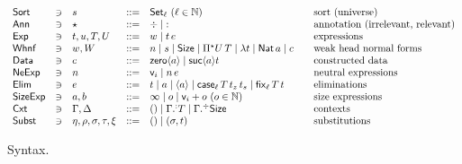 \documentclass[acmlarge,review,anonymous]{acmart}\settopmatter{printfolios=true}
\begin{document}
\begin{figure}[htbp]
  \centering
\[
\begin{array}{lllrl@{\qquad}l}
\Sort & \ni & s
    & ::= & \Set[\ell] ~(\ell \in \NN)& \mbox{sort (universe)} \\
\Ann & \ni & \star & ::= & \erased \mid \noterased & \mbox{annotation (irrelevant, relevant)}\\
\Exp & \ni & t,u,T,U
    & ::= & w \mid t\,e & \mbox{expressions} \\
\Whnf & \ni & w, W
    & ::= & n \mid s \mid \Size \mid \epiT U T %
    \mid \lambda t%
    \mid \Nat a \mid c & \mbox{weak head normal forms} \\ %
\Data & \ni & c
   & ::= & \zero a \mid \suc a t & \mbox{constructed data} \\
\NeExp & \ni & n
    & ::= & \ind i \mid n \, e & \mbox{neutral expressions} \\
\Elim & \ni & e
    & ::= & t \mid a \mid \ann a \mid \case[\ell] T {t_z} {t_s} \mid \fix[\ell] T t & \mbox{eliminations} \\
\SizeExp & \ni & a,b & ::= & \infty \mid o \mid \ind i + o ~(o \in \NN) & \mbox{size expressions} \\
\Cxt & \ni & \Gamma, \Delta & ::= & \cempty \mid \erext[\noterased] \Gamma T \mid \erext \Gamma \Size
   & \mbox{contexts} \\
\Subst & \ni & \eta,\rho,\sigma,\tau,\xi & ::= & \sempty \mid (\sigma,t)
  & \mbox{substitutions} \\
\end{array}
\]
\vspace{-4ex}
  \caption{Syntax.}
  \label{fig:syntax}
\end{figure}
\end{document}
